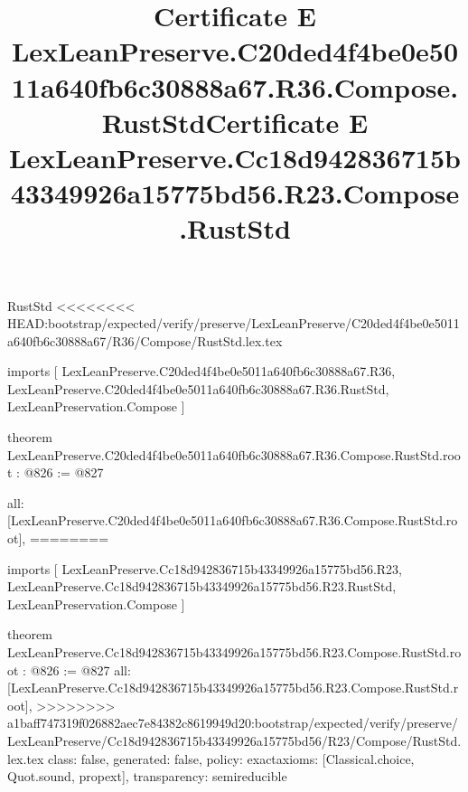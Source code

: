 \begin{lexlean}{RustStd}
<<<<<<<< HEAD:bootstrap/expected/verify/preserve/LexLeanPreserve/C20ded4f4be0e5011a640fb6c30888a67/R36/Compose/RustStd.lex.tex
\title{Certificate E LexLeanPreserve.C20ded4f4be0e5011a640fb6c30888a67.R36.Compose.RustStd}
\begin{coremodule}
imports [
  LexLeanPreserve.C20ded4f4be0e5011a640fb6c30888a67.R36,
  LexLeanPreserve.C20ded4f4be0e5011a640fb6c30888a67.R36.RustStd,
  LexLeanPreservation.Compose
]

theorem LexLeanPreserve.C20ded4f4be0e5011a640fb6c30888a67.R36.Compose.RustStd.root : @826 := @827 {
  all: [LexLeanPreserve.C20ded4f4be0e5011a640fb6c30888a67.R36.Compose.RustStd.root],
========
\title{Certificate E LexLeanPreserve.Cc18d942836715b43349926a15775bd56.R23.Compose.RustStd}
\begin{coremodule}
imports [
  LexLeanPreserve.Cc18d942836715b43349926a15775bd56.R23,
  LexLeanPreserve.Cc18d942836715b43349926a15775bd56.R23.RustStd,
  LexLeanPreservation.Compose
]

theorem LexLeanPreserve.Cc18d942836715b43349926a15775bd56.R23.Compose.RustStd.root : @826 := @827 {
  all: [LexLeanPreserve.Cc18d942836715b43349926a15775bd56.R23.Compose.RustStd.root],
>>>>>>>> a1baff747319f026882aec7e84382c8619949d20:bootstrap/expected/verify/preserve/LexLeanPreserve/Cc18d942836715b43349926a15775bd56/R23/Compose/RustStd.lex.tex
  class: false,
  generated: false,
  policy: exact{axioms: [Classical.choice, Quot.sound, propext]},
  transparency: semireducible
}


\end{coremodule}}
\end{coremodule}
\end{lexlean}
